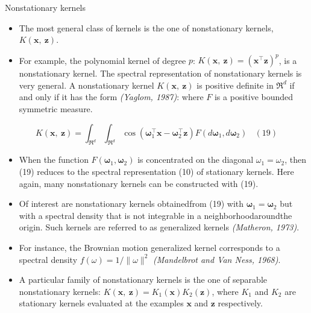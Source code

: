 \documentclass[
  ignorenonframetext,
]{beamer}
\providecommand{\tightlist}{%
  \setlength{\itemsep}{0pt}\setlength{\parskip}{0pt}}
\begin{document}
\begin{frame}{Nonstationary kernels}
\protect\hypertarget{nonstationary-kernels-1}{}
\begin{itemize}
\item
  The most general class of kernels is the one of nonstationary kernels,
  \(K(\pmb x,\ \pmb z)\).
\item
  For example, the polynomial kernel of degree \(p\):
  \(K(\pmb x,\ \pmb z) = (\pmb x^{\top}\pmb z)^p\), is a nonstationary
  kernel. The spectral representation of nonstationary kernels is very
  general. A nonstationary kernel \(K(\pmb x,\ \pmb z)\) is positive
  definite in \(\mathfrak R^d\) if and only if it has the form
  \emph{(Yaglom, 1987)}: where \(F\) is a positive bounded symmetric
  measure.
\end{itemize}

\[
K(\pmb x,\ \pmb z) = \int_{\mathfrak R^d} \int_{\mathfrak R^d} \cos(\pmb\omega_1^{\top} \pmb x-\pmb\omega_2^{\top} \pmb z)F (d\pmb\omega_1, d\pmb\omega_2)\ \ \ \ (19)
\]

\begin{itemize}
\tightlist
\item
  When the function \(F(\pmb \omega_1, \pmb\omega_2)\) is concentrated
  on the diagonal \(\omega_1 = \omega_2\), then (19) reduces to the
  spectral representation (10) of stationary kernels. Here again, many
  nonstationary kernels can be constructed with (19).
\end{itemize}
\end{frame}

\begin{frame}{}
\protect\hypertarget{section-15}{}
\begin{itemize}
\item
  Of interest are nonstationary kernels obtainedfrom (19) with
  \(\pmb \omega_1 = \pmb \omega_2\) but with a spectral density that is
  not integrable in a neighborhoodaroundthe origin. Such kernels are
  referred to as generalized kernels \emph{(Matheron, 1973)}.
\item
  For instance, the Brownian motion generalized kernel corresponds to a
  spectral density \(f(\omega) = 1/\|\omega\|^2\) \emph{(Mandelbrot and
  Van Ness, 1968)}.
\item
  A particular family of nonstationary kernels is the one of separable
  nonstationary kernels:
  \(K(\pmb x,\ \pmb z) = K_1(\pmb x)K_2(\pmb z)\), where \(K_1\) and
  \(K_2\) are stationary kernels evaluated at the examples \(\pmb x\)
  and \(\pmb z\) respectively.
\end{itemize}
\end{frame}
\end{document}
